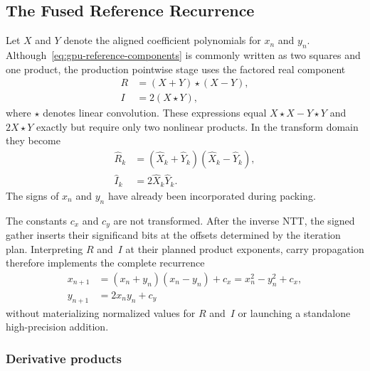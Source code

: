 \subsection{The Fused Reference Recurrence}
\label{subsec:fused-ntt-reference-step}

Let $X$ and $Y$ denote the aligned coefficient polynomials for $x_n$ and
$y_n$.  Although~\eqref{eq:gpu-reference-components} is commonly written as
two squares and one product, the production pointwise stage uses the factored
real component
\begin{align}
  R &= (X+Y)\star(X-Y),
       \label{eq:fused-reference-real} \\
  I &= 2(X\star Y),
       \label{eq:fused-reference-imag}
\end{align}
where $\star$ denotes linear convolution.  These expressions equal
$X\star X-Y\star Y$ and $2X\star Y$ exactly but require only two nonlinear
products.  In the transform domain they become
\begin{align}
  \widehat R_k &= (\widehat X_k+\widehat Y_k)
                  (\widehat X_k-\widehat Y_k), \\
  \widehat I_k &= 2\widehat X_k\widehat Y_k.
  \label{eq:fused-reference-pointwise}
\end{align}
The signs of $x_n$ and $y_n$ have already been incorporated during packing.

The constants $c_x$ and $c_y$ are not transformed.  After the inverse NTT,
the signed gather inserts their significand bits at the offsets determined by
the iteration plan.  Interpreting $R$ and~$I$ at their planned product
exponents, carry propagation therefore implements the complete recurrence
\begin{align}
  x_{n+1} &= (x_n+y_n)(x_n-y_n)+c_x
           =x_n^2-y_n^2+c_x, \\
  y_{n+1} &= 2x_ny_n+c_y
\end{align}
without materializing normalized values for $R$ and~$I$ or launching a
standalone high-precision addition.

\subsubsection{Derivative products}
\label{subsec:fused-ntt-derivatives}

